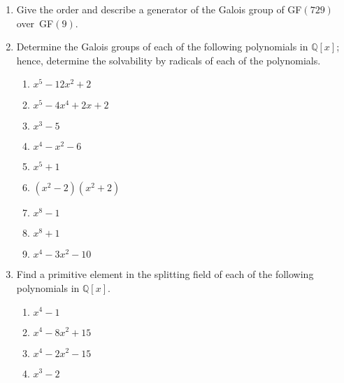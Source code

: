 {\begin{enumerate}
\item
Give the order and describe a generator of the Galois group of
GF$(729)$ over~GF$(9)$.

 
\item
Determine the Galois groups of each of the following polynomials in
${\mathbb Q}[x]$; hence, determine the solvability by radicals of each 
of the polynomials.
\begin{multicols}{2}
\begin{enumerate}

\item 
$x^5 - 12 x^2 + 2$

\item 
$x^5 - 4 x^4 + 2 x + 2$

\item 
$x^3 - 5$

\item 
$x^4 - x^2 - 6$

\item 
$x^5 + 1$

\item 
$(x^2 - 2)(x^2 + 2)$

\item 
$x^8 - 1$

\item 
$x^8 + 1$

\item 
$x^4 - 3 x^2 -10$


\end{enumerate}
\end{multicols}
 
 
 
\item
Find a primitive element in the splitting field of each of the
following polynomials in ${\mathbb Q}[x]$.
\begin{multicols}{2}
\begin{enumerate}

\item 
$x^4 - 1$

\item 
$x^4 - 8 x^2 + 15$

\item 
$x^4 - 2 x^2 - 15$

\item 
$x^3 - 2$

\end{enumerate}
\end{multicols}
  
 
 

\end{enumerate}}
